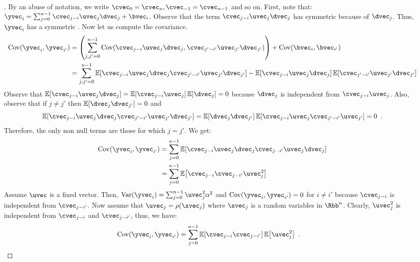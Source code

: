 \begin{proof}[]
  By an abuse of notation, we write $\cvec_0 = \cvec_n, \cvec_{-1} = \cvec_{n-1}$ and so on.
  First, note that: $\yvec_i = \sum_{j=0}^{n-1} \cvec_{j-i} \uvec_j \dvec_j + \bvec_i$.
  Observe that the term $\cvec_{j-i}\uvec_j\dvec_j$ has symmetric \pdf because of $\dvec_j$.
  Thus, $\yvec_i$ has a symmetric \pdf.
  Now let us compute the covariance.
  \begin{align}
    \Cov(\yvec_i,\yvec_{i'}) &= \left( \sum_{j,j'=0}^{n-1} \Cov\left(\cvec_{j-i}\uvec_j\dvec_j,\cvec_{j'-i'}\uvec_{j'}\dvec_{j'}\right) \right) + \Cov(\bvec_i, \bvec_{i'}) \\
      &= \sum_{j,j'=0}^{n-1} \Ebb\left[\cvec_{j-i}\uvec_j\dvec_j\cvec_{j'-i'}\uvec_{j'}\dvec_{j'}\right] - \Ebb\left[\cvec_{j-i}\uvec_j\dvec_j\right] \Ebb\left[ \cvec_{j'-i'}\uvec_{j'}\dvec_{j'} \right]
  \end{align}
  Observe that $\Ebb\left[\cvec_{j-i}\uvec_j\dvec_j\right] = \Ebb\left[\cvec_{j-i}\uvec_j\right] \Ebb\left[\dvec_j\right] = 0$ because $\dvec_j$ is independent from $\cvec_{j-i}\uvec_j$.
  Also, observe that if $j\neq j'$ then $\Ebb\left[\dvec_j\dvec_{j'}\right]=0$ and
  \begin{equation}
    \Ebb\left[\cvec_{j-i} \uvec_j \dvec_j \cvec_{j'-i'} \uvec_{j'} \dvec_{j'} \right] = \Ebb\left[ \dvec_j \dvec_{j'} \right] \Ebb\left[ \cvec_{j-i} \uvec_j \cvec_{j'-i'} \uvec_{j'} \right] = 0 \enspace.
  \end{equation}
  Therefore, the only non null terms are those for which $j = j'$.
  We get:
  \begin{align}
    \Cov(\yvec_i,\yvec_{i'}) & =\sum_{j=0}^{n-1} \Ebb\left[\cvec_{j-i}\uvec_j\dvec_j\cvec_{j-i'}\uvec_j\dvec_j\right] \\
     & =\sum_{j=0}^{n-1} \Ebb\left[\cvec_{j-i}\cvec_{j-i'}\uvec_j^{2}\right]
 \end{align}
  Assume $\uvec$ is a fixed vector.
  Then, $\Var(\yvec_i) = \sum_{j=0}^{n-1} \uvec_j^{2} \alpha^2$ and $\Cov(\yvec_i,\yvec_{i'}) = 0$ for $i\neq i'$ because $\cvec_{j-i}$ is independent from $\cvec_{j-i'}$.
  Now assume that $\uvec_j = \rho(\xvec_j)$ where $\xvec_j$ is a random variables in $\Rbb^n$.
  Clearly, $\uvec_j^2$ is independent from $\cvec_{j-i}$ and $\cvec_{j-i'}$, thus, we have:
  \begin{align}
    \Cov(\yvec_i,\yvec_{i'}) &= \sum_{j=0}^{n-1} \Ebb \left[ \cvec_{j-i}\cvec_{j-i'}\right] \Ebb\left[ \uvec_j^2 \right] \enspace.
  \end{align}

\end{proof}
